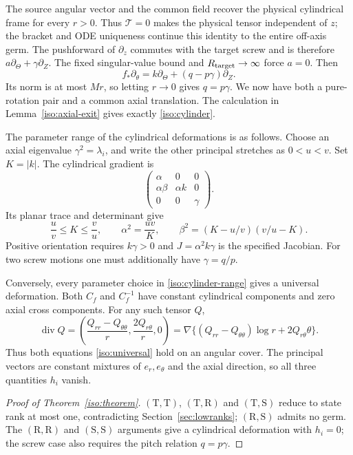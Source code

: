 \documentclass[11pt,a4paper]{article}
\numberwithin{equation}{section}
\theoremstyle{plain}
\theoremstyle{definition}
\theoremstyle{remark}
\begin{document}
The source angular vector and the common field recover the physical
cylindrical frame for every $r>0$. Thus $\mathcal T=0$ makes the
physical tensor independent of $z$; the bracket and ODE uniqueness
continue this identity to the entire off-axis germ.
The pushforward of $\partial_z$ commutes with the target screw and is
therefore $a\partial_\Theta+\gamma\partial_Z$.
The fixed singular-value bound and $R_{\rm target}\to\infty$ force $a=0$.
Then
\[
 f_*\partial_\theta=k\partial_\Theta+(q-p\gamma)\partial_Z.
\]
Its norm is at most $Mr$, so letting $r\to0$ gives $q=p\gamma$.
We now have both a pure-rotation pair and a common axial translation.
The calculation in Lemma~\ref{iso:axial-exit} gives exactly
\eqref{iso:cylinder}.  

The parameter range of the cylindrical deformations is as follows.  Choose an axial eigenvalue $\gamma^2=\lambda_i$,
and write the other principal stretches as $0<u<v$.  Set $K=|k|$.
The cylindrical gradient is
\[
 \begin{pmatrix}\alpha&0&0\\
                 \alpha\beta&\alpha k&0\\0&0&\gamma\end{pmatrix}.
\]
Its planar trace and determinant give
\begin{equation}\label{iso:cylinder-range}
 \frac uv\le K\le\frac vu,\qquad
 \alpha^2=\frac{uv}{K},\qquad
 \beta^2=(K-u/v)(v/u-K).
\end{equation}
Positive orientation requires $k\gamma>0$ and
$J=\alpha^2k\gamma$ is the specified Jacobian.  For two screw motions one must additionally
have $\gamma=q/p$.  

Conversely, every parameter choice in \eqref{iso:cylinder-range} gives
a universal deformation.  Both $C_f$ and $C_f^{-1}$ have constant
cylindrical components and zero axial cross components.  For any such
tensor $Q$,
\[
 \operatorname{div}Q=
 \left(\frac{Q_{rr}-Q_{\theta\theta}}r,\frac{2Q_{r\theta}}r,0\right)
 =\nabla\{(Q_{rr}-Q_{\theta\theta})\log r+2Q_{r\theta}\theta\}.
\]
Thus both equations \eqref{iso:universal} hold on an angular cover.
The principal vectors are constant mixtures of $e_r,e_\theta$ and the
axial direction, so all three quantities $h_i$ vanish.

\begin{proof}[Proof of Theorem~\ref{iso:theorem}]
$(\mathrm{T},\mathrm{T})$, $(\mathrm{T},\mathrm{R})$ and $(\mathrm{T},\mathrm{S})$ reduce to state rank at most one, contradicting
Section~\ref{sec:lowranks}; $(\mathrm{R},\mathrm{S})$ admits no germ.  The $(\mathrm{R},\mathrm{R})$ and $(\mathrm{S},\mathrm{S})$
arguments give a cylindrical deformation with $h_i=0$; the screw
case also requires the pitch relation $q=p\gamma$.
\end{proof}
\end{document}
